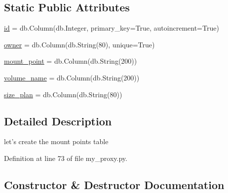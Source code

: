 \subsection*{Static Public Attributes}
\begin{DoxyCompactItemize}
\item 
\hyperlink{classdocker-proxy_1_1my__proxy_1_1_mount_points_a17378df4d222e5d86f97d966e5ba30ee}{id} = db.\+Column(db.\+Integer, primary\+\_\+key=True, autoincrement=True)
\item 
\hyperlink{classdocker-proxy_1_1my__proxy_1_1_mount_points_aa49cde7530c0edaec96a4407707e714d}{owner} = db.\+Column(db.\+String(80), unique=True)
\item 
\hyperlink{classdocker-proxy_1_1my__proxy_1_1_mount_points_aa7cfbe6eb066a60a4b6a0399fc64e003}{mount\+\_\+point} = db.\+Column(db.\+String(200))
\item 
\hyperlink{classdocker-proxy_1_1my__proxy_1_1_mount_points_aec1c878c659bd308f99b529d397d85c7}{volume\+\_\+name} = db.\+Column(db.\+String(200))
\item 
\hyperlink{classdocker-proxy_1_1my__proxy_1_1_mount_points_a6008b3f58ac2dd027f1d637cc84ee78c}{size\+\_\+plan} = db.\+Column(db.\+String(80))
\end{DoxyCompactItemize}


\subsection{Detailed Description}
\begin{DoxyVerb}let's create the mount points table
\end{DoxyVerb}
 

Definition at line 73 of file my\+\_\+proxy.\+py.



\subsection{Constructor \& Destructor Documentation}
\hypertarget{classdocker-proxy_1_1my__proxy_1_1_mount_points_a559b6a122b5406dda695f40dc5eda8e9}{}\label{classdocker-proxy_1_1my__proxy_1_1_mount_points_a559b6a122b5406dda695f40dc5eda8e9} 

